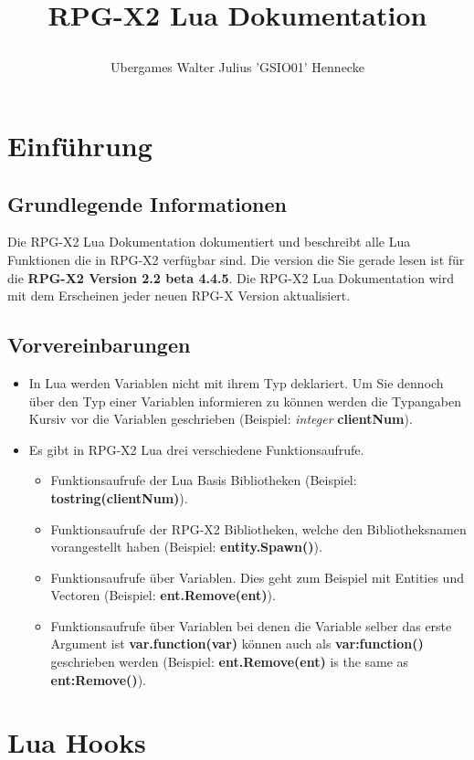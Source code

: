 \documentclass[11pt,a4paper]{book}
\begin{document}
\title{
\Huge RPG-X2 Lua Dokumentation
\author{
Ubergames
Walter Julius 'GSIO01' Hennecke}
}
\maketitle
\newpage
\tableofcontents
\chapter{Einführung}
\label{intro}
\section{Grundlegende Informationen}
\label{gen-info}
Die RPG-X2 Lua Dokumentation dokumentiert und beschreibt alle Lua Funktionen die in RPG-X2 verfügbar sind. Die version die Sie gerade lesen ist für die \textbf{RPG-X2 Version 2.2 beta 4.4.5}. Die RPG-X2 Lua Dokumentation wird mit dem Erscheinen jeder neuen RPG-X Version aktualisiert.
\section{Vorvereinbarungen}
\label{preq}
\begin{itemize}
    \item In Lua werden Variablen nicht mit ihrem Typ deklariert. Um Sie dennoch über den Typ einer Variablen informieren zu können werden die Typangaben Kursiv vor die Variablen geschrieben (Beispiel: \textit{integer} \textbf{clientNum}).
    \item Es gibt in RPG-X2 Lua drei verschiedene Funktionsaufrufe.\begin{itemize}
    \item Funktionsaufrufe der Lua Basis Bibliotheken (Beispiel: \textbf{\textbf{tostring(clientNum)}}).
    \item Funktionsaufrufe der RPG-X2 Bibliotheken, welche den Bibliotheksnamen vorangestellt haben (Beispiel: \textbf{entity.Spawn()}).
    \item Funktionsaufrufe über Variablen. Dies geht zum Beispiel mit Entities und Vectoren (Beispiel: \textbf{ent.Remove(ent)}).
    \item Funktionsaufrufe über Variablen bei denen die Variable selber das erste Argument ist \textbf{var.function(var)} können auch als \textbf{var:function()} geschrieben werden (Beispiel: \textbf{ent.Remove(ent)} is the same as \textbf{ent:Remove()}).
\end{itemize}
\end{itemize}
\chapter{Lua Hooks}
\label{lua-hooks}
\end{document}
